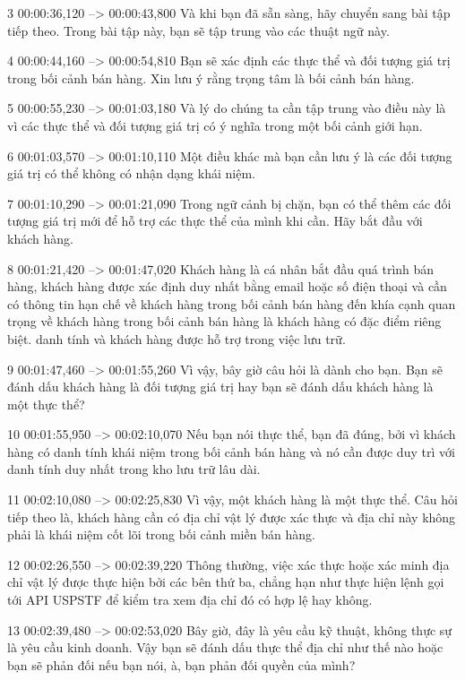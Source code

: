 3
00:00:36,120 --> 00:00:43,800
Và khi bạn đã sẵn sàng, hãy chuyển sang bài tập tiếp theo.  Trong bài tập này, bạn sẽ tập trung vào các thuật ngữ này.

4
00:00:44,160 --> 00:00:54,810
Bạn sẽ xác định các thực thể và đối tượng giá trị trong bối cảnh bán hàng.  Xin lưu ý rằng trọng tâm là bối cảnh bán hàng.

5
00:00:55,230 --> 00:01:03,180
Và lý do chúng ta cần tập trung vào điều này là vì các thực thể và đối tượng giá trị có ý nghĩa trong một bối cảnh giới hạn.

6
00:01:03,570 --> 00:01:10,110
Một điều khác mà bạn cần lưu ý là các đối tượng giá trị có thể không có nhận dạng khái niệm.

7
00:01:10,290 --> 00:01:21,090
Trong ngữ cảnh bị chặn, bạn có thể thêm các đối tượng giá trị mới để hỗ trợ các thực thể của mình khi cần.  Hãy bắt đầu với khách hàng.

8
00:01:21,420 --> 00:01:47,020
Khách hàng là cá nhân bắt đầu quá trình bán hàng, khách hàng được xác định duy nhất bằng email hoặc số điện thoại và cần có thông tin hạn chế về khách hàng trong bối cảnh bán hàng đến khía cạnh quan trọng về khách hàng trong bối cảnh bán hàng là khách hàng có đặc điểm riêng biệt.  danh tính và khách hàng được hỗ trợ trong việc lưu trữ.

9
00:01:47,460 --> 00:01:55,260
Vì vậy, bây giờ câu hỏi là dành cho bạn.  Bạn sẽ đánh dấu khách hàng là đối tượng giá trị hay bạn sẽ đánh dấu khách hàng là một thực thể?

10
00:01:55,950 --> 00:02:10,070
Nếu bạn nói thực thể, bạn đã đúng, bởi vì khách hàng có danh tính khái niệm trong bối cảnh bán hàng và nó cần được duy trì với danh tính duy nhất trong kho lưu trữ lâu dài.

11
00:02:10,080 --> 00:02:25,830
Vì vậy, một khách hàng là một thực thể.  Câu hỏi tiếp theo là, khách hàng cần có địa chỉ vật lý được xác thực và địa chỉ này không phải là khái niệm cốt lõi trong bối cảnh miền bán hàng.

12
00:02:26,550 --> 00:02:39,220
Thông thường, việc xác thực hoặc xác minh địa chỉ vật lý được thực hiện bởi các bên thứ ba, chẳng hạn như thực hiện lệnh gọi tới API USPSTF để kiểm tra xem địa chỉ đó có hợp lệ hay không.

13
00:02:39,480 --> 00:02:53,020
Bây giờ, đây là yêu cầu kỹ thuật, không thực sự là yêu cầu kinh doanh.  Vậy bạn sẽ đánh dấu thực thể địa chỉ như thế nào hoặc bạn sẽ phản đối nếu bạn nói, à, bạn phản đối quyền của mình?


